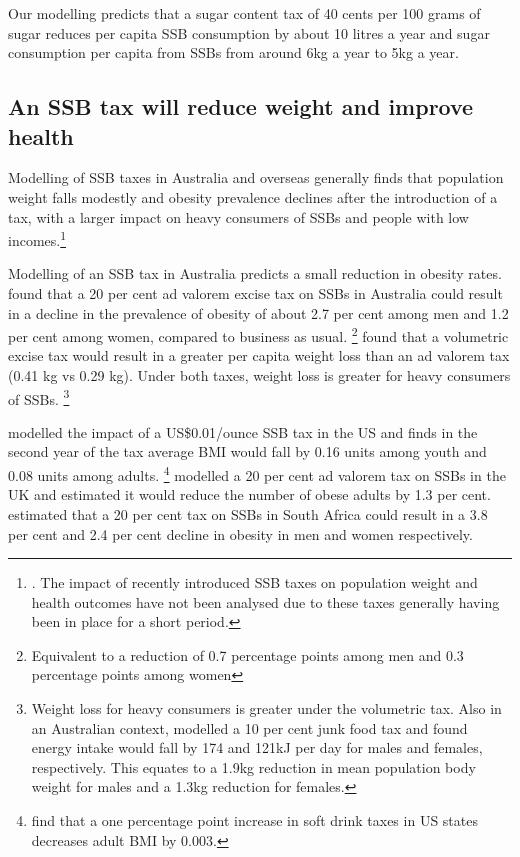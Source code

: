 \documentclass[embargoed]{grattan}
\begin{document}
Our modelling predicts that a sugar content tax of 40 cents per 100 grams of sugar reduces per capita SSB consumption by about 10 litres a year and sugar consumption per capita from SSBs from around 6kg a year to 5kg a year.

\subsection{An SSB tax will reduce weight and improve health}\label{an-ssb-tax-will-reduce-weight-and-improve-health}

Modelling of SSB taxes in Australia and overseas generally finds that population weight falls modestly and obesity prevalence declines after the introduction of a tax, with a larger impact on heavy consumers of SSBs and people with low incomes.\footnote{\textcites{Briggs2013Overallincomespecific}{Manyema2014potentialimpact20}{Organization2016FiscalPoliciesDiet}{Veerman2016ImpactTaxSugar}{Sharma2014effectstaxingsugarsweetened}{Andreyeva2011Estimatingpotentialtaxes}.
The impact of recently introduced SSB taxes on population weight and health outcomes have not been analysed due to these taxes generally having been in place for a short period.}

Modelling of an SSB tax in Australia predicts a small reduction in obesity rates. \textcite{Veerman2016ImpactTaxSugar} found that a 20 per cent ad valorem excise tax on SSBs in Australia could result in a decline in the prevalence of obesity of about 2.7 per cent among men and 1.2 per cent among women, compared to business as usual.%
\footnote{Equivalent to a reduction of 0.7 percentage points among men and 0.3 percentage points among women} \textcite{Sharma2014effectstaxingsugarsweetened} found that a volumetric excise tax would result in a greater per capita weight loss than an ad valorem tax (0.41 kg vs 0.29 kg).
Under both taxes, weight loss is greater for heavy consumers of SSBs. \footnote{Weight loss for heavy consumers is greater under the volumetric tax. Also in an Australian context, \textcite{Sacks2011Statesshouldstand} modelled a 10 per cent junk food tax and found energy intake would fall by 174 and 121kJ per day for males and females, respectively.
This equates to a 1.9kg reduction in mean population body weight for males and a 1.3kg reduction for females.}

\textcite{Long2015Costeffectivenesssugar} modelled the impact of a US\$0.01/ounce SSB tax in the US and finds in the second year of the tax average BMI would fall by 0.16 units among youth and 0.08 units among adults.%
\footnote{\textcite{Fletcher2010Cansoftdrink} find that a one percentage point increase in soft drink taxes in US states decreases adult BMI by 0.003.} \textcite{Briggs2013Overallincomespecific} modelled a 20 per cent ad valorem tax on SSBs in the UK and estimated it would reduce the number of obese adults by 1.3 per cent. \textcite{Manyema2014potentialimpact20} estimated that a 20 per cent tax on SSBs in South Africa could result in a 3.8 per cent and 2.4 per cent decline in obesity in men and women respectively.
\end{document}
